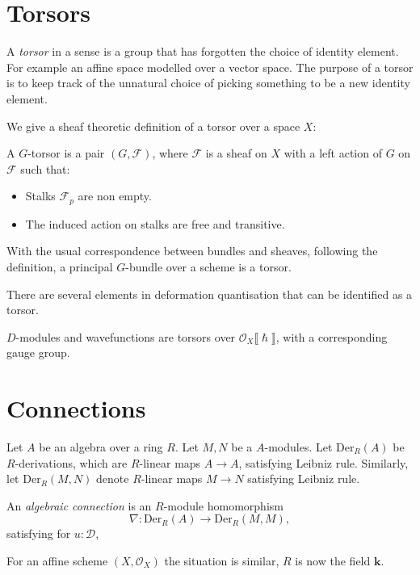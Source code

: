     \section{Torsors}
    A \emph{torsor} in a sense is a group that has forgotten the choice of identity element. For example an affine space modelled over a vector space. The purpose of a torsor is to keep track of the unnatural choice of picking something to be a new identity element.
    
    We give a sheaf theoretic definition of a torsor \cite{sheaves_logic} over a space \(X \):
    \begin{defn}[Torsor] 
    A \(G\)-torsor is a pair \((G,\mathcal{F})\), where \( \mathcal{F}\) is a sheaf on \(X\) with a left action of \(G\) on \( \mathcal{F}\) such that:
    \begin{itemize}
        \item Stalks \( \mathcal{F}_p\) are non empty.
        \item The induced action on stalks are free and transitive.
    \end{itemize}
    \end{defn}
    
    \begin{ex} With the usual correspondence between bundles and sheaves, following the definition, a principal \(G\)-bundle over a scheme is a torsor.
    \end{ex}


    There are several elements in deformation quantisation that can be identified as a torsor.
    
    
    \begin{ex}
    \(D\)-modules and wavefunctions are torsors over \( \mathcal{O}_X \lBrack\hslash \rBrack\), with a corresponding gauge group. 
    \end{ex}
    
    \section{Connections}
    
    
    Let \(A\) be an algebra over a ring \(R\).
    Let \(M,N\) be a \(A\)-modules. Let \( \mathrm{Der}_{R}(A)\) be \(R\)-derivations, which are \(R\)-linear maps \( A \rightarrow A\), satisfying Leibniz rule. Similarly, let \( \mathrm{Der}_R(M,N)\) denote \(R\)-linear maps \(M \rightarrow N\) satisfying Leibniz rule.

    
    \begin{defn}
    An \emph{algebraic connection} is an \(R\)-module homomorphism \[ \nabla : \mathrm{Der}_R(A) \rightarrow \mathrm{Der}_R(M,M),\] satisfying for \( u : \mathcal{D}\), 
    
    \end{defn}
    
    For an affine scheme \((X,\mathcal{O}_X)\)  the situation is similar, \(R\) is now the field \( \mathbf{k}\).  
    
    